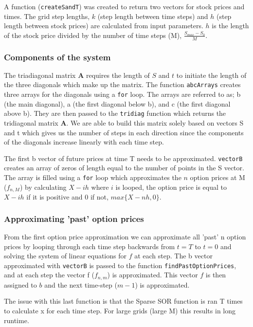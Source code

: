 \documentclass[paper=a4, fontsize=10pt]{article} %
\begin{document}
A function (\texttt{createSandT}) was created to return two vectors for stock prices and times. The grid step lengths, $k$ (step length between time steps) and $h$ (step length between stock prices) are calculated from input parameters. $h$ is the length of the stock price divided by the number of time steps (M), $\frac{S_{max} - S_{0}}{M}$.

\subsubsection{Components of the system}
The triadiagonal matrix $\textbf{A}$ requires the length of $S$ and $t$ to initiate the length of the three diagonals which make up the matrix. The function \texttt{abcArrays} creates three arrays for the diagonals using a \texttt{for} loop. The arrays are referred to as; b (the main diagonal), a (the first diagonal below b), and c (the first diagonal above b). They are then passed to the \texttt{tridiag} function which returns the tridiagonal matrix $\textbf{A}$. We are able to build this matrix solely based on vectors S and t which gives us the number of steps in each direction since the components of the diagonals increase linearly with each time step. 

The first b vector of future prices at time T needs to be approximated. \texttt{vectorB} creates an array of zeros of length equal to the number of points in the S vector. The array is filled using a \texttt{for} loop which approximates the $n$ option prices at M ($f_{n,M}$) by calculating $X - ih$ where $i$ is looped, the option price is equal to $X - ih$ if it is positive and 0 if not, $max \{ X - nh, 0 \}$.

\subsubsection{Approximating 'past' option prices}

From the first option price approximation we can approximate all 'past' n option prices by looping through each time step backwards from $t=T$ to $t=0$ and solving the system of linear equations for $f$ at each step. The b vector approximated with \texttt{vectorB} is passed to the function \texttt{findPastOptionPrices}, and at each step the vector f ($f_{n,m}$) is approximated. This vector $f$ is then assigned to $b$ and the next time-step ($m-1$) is approximated.

The issue with this last function is that the Sparse SOR function is ran T times to calculate x for each time step. For large grids (large M) this results in long runtime.
\end{document}
